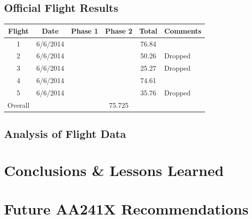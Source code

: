 \documentclass[11pt]{article}
\begin{document}
\subsection{Official Flight Results}
\label{OffFltRes}
\begin{center}
    \begin{tabular}{ | c | c | c | c | c | p{3cm} |}
    \hline
    \textbf{Flight} & \textbf{Date} & \textbf{Phase 1} & \textbf{Phase 2} & \textbf{Total} & \textbf{Comments} \\ \hline
    1 & 6/6/2014 &  &  & 76.84 & \\ \hline
    2 & 6/6/2014 &  &  & 50.26 & Dropped\\ \hline
    3 & 6/6/2014 &  &  & 25.27 & Dropped\\ \hline
    4 & 6/6/2014 &  &  & 74.61 & \\ \hline
    5 & 6/6/2014 &  &  & 35.76 & Dropped\\ \hline
    Overall & \multicolumn{5}{c|}{75.725}\\ \hline   
    \end{tabular}
\end{center}

\subsection{Analysis of Flight Data}
\label{AnalFltData}


\section{Conclusions \& Lessons Learned}
\label{Conclusion}

\section{Future AA241X Recommendations}
\label{Recommendations}
\end{document}
